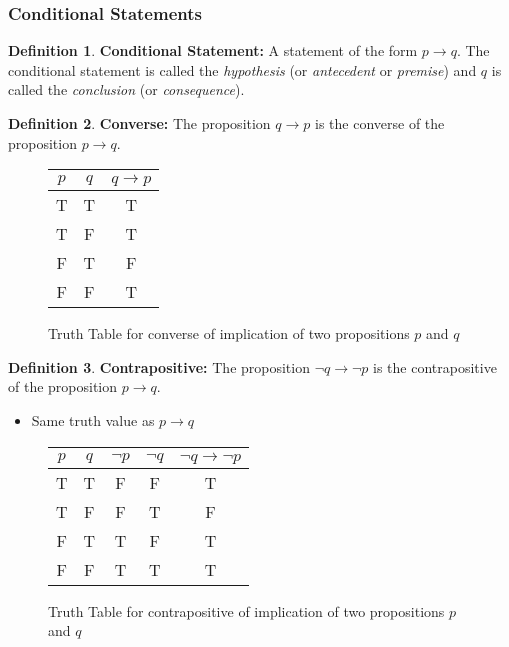 \documentclass[article, 11pt]{article}
\theoremstyle{definition}
\newtheorem{definition}{Definition}[section]
\begin{document}
    \subsubsection{Conditional Statements}
    \begin{definition}
        \textbf{Conditional Statement:} A statement of the form $p \to q$. The conditional statement is called the \textit{hypothesis} (or \textit{antecedent} or \textit{premise}) and $q$ is called the \textit{conclusion} (or \textit{consequence}). 
    \end{definition}
    \begin{definition}
        \textbf{Converse:} The proposition $q \to p$ is the converse of the proposition $p \to q$. 
    \end{definition}
    \begin{figure}[H]
        \centering
            \begin{tabular}{c|c|c}
                $p$ & $q$ & $q \to p$ \\
                \hline
                T & T & T \\
                T & F & T \\
                F & T & F \\
                F & F & T 
            \end{tabular}   
        \caption{Truth Table for converse of implication of two propositions $p$ and $q$}
    \end{figure}
    \begin{definition}
        \textbf{Contrapositive:} The proposition $\neg q \to \neg p$ is the contrapositive of the proposition $p \to q$.  
    \end{definition}
    \begin{itemize}
        \item Same truth value as $p \to q$
    \end{itemize}
    \begin{figure}[H]
        \centering
            \begin{tabular}{c|c|c|c|c}
                $p$ & $q$ & $\neg{p}$ & $\neg{q}$ & $\neg q \to \neg p$ \\
                \hline
                T & T & F & F & T \\
                T & F & F & T & F \\
                F & T & T & F & T \\
                F & F & T & T & T
            \end{tabular}   
        \caption{Truth Table for contrapositive of implication of two propositions $p$ and $q$}
    \end{figure}
\end{document}
